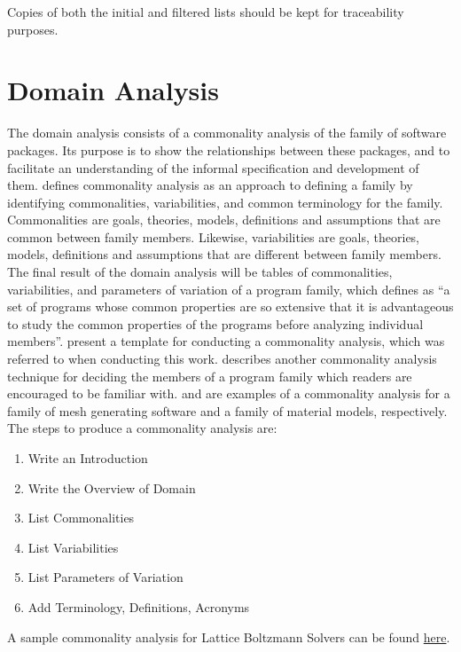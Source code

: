 \documentclass[letterpaper,cleveref]{lipics-v2019}
\theoremstyle{definition}
\begin{document}
Copies of both the initial and filtered lists should be kept for traceability purposes.

\section{Domain Analysis} \label{SecDomainAnalysis}

The domain analysis consists of a commonality analysis of the family of software
packages. Its purpose is to show the relationships between these packages, and
to facilitate an understanding of the informal specification and development of
them. \cite{weiss1997defining} defines commonality analysis as an approach to
defining a family by identifying commonalities, variabilities, and common
terminology for the family. Commonalities are goals, theories, models,
definitions and assumptions that are common between family members. Likewise,
variabilities are goals, theories, models, definitions and assumptions that are
different between family members. The final result of the domain analysis will
be tables of commonalities, variabilities, and parameters of variation of a
program family, which \cite{parnas1976design} defines as ``a set of programs
whose common properties are so extensive that it is advantageous to study the
common properties of the programs before analyzing individual
members''. \cite{smith2008commonality} present a template for conducting a
commonality analysis, which was referred to when conducting this
work. \cite{weiss1998commonality} describes another commonality analysis
technique for deciding the members of a program family which readers are
encouraged to be familiar with. \cite{SmithAndChen2004} and
\cite{SmithMcCutchanAndCarette2017} are examples of a commonality analysis for a
family of mesh generating software and a family of material models,
respectively. The steps to produce a commonality analysis are:

\begin{enumerate}
\item Write an Introduction
\item Write the Overview of Domain
\item List Commonalities
\item List Variabilities
\item List Parameters of Variation
\item Add Terminology, Definitions, Acronyms
\end{enumerate}

A sample commonality analysis for Lattice Boltzmann Solvers can be found
\href{https://github.com/smiths/AIMSS/blob/master/StateOfPractice/Peter-Notes/Commonality-Analysis-LB-Systems.pdf}{here}.
\end{document}

